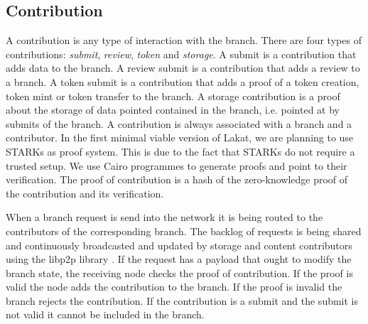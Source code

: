 % 

% 
% 
% 
% 
% 


\subsection{Contribution}
\label{ssc:contribution}

A contribution is any type of interaction with the branch. There are four types of contributions: \textit{submit}, \textit{review}, \textit{token} and \textit{storage}. A submit is a contribution that adds data to the branch. A review submit is a contribution that adds a review to a branch. A token submit is a contribution that adds a proof of a token creation, token mint or token transfer to the branch. A storage contribution is a proof about the storage of data pointed contained in the branch, i.e. pointed at by submits of the branch. A contribution is always associated with a branch and a contributor. In the first minimal viable version of Lakat, we are planning to use STARKs \cite{} as proof system. This is due to the fact that STARKs do not require a trusted setup. We use Cairo programmes to generate proofs and point to their verification. The proof of contribution is a hash of the zero-knowledge proof of the contribution and its verification.


When a branch request is send into the network it is being routed to the contributors of the corresponding branch. The backlog of requests is being shared and continuously broadcasted and updated by storage and content contributors using the libp2p library \cite{}. If the request has a payload that ought to modify the branch state, the receiving node checks the proof of contribution. If the proof is valid the node adds the contribution to the branch. If the proof is invalid the branch rejects the contribution. If the contribution is a submit and the submit is not valid it cannot be included in the branch. 